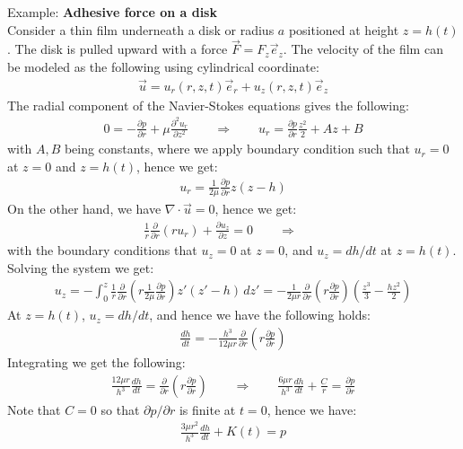 \documentclass[11pt]{book}
\theoremstyle{break}
\theoremstyle{break}
\newcommand{\pd}{\partial}
\newcommand{\example}{\color{green}Example: \color{black}}
\begin{document}
\example \textbf{Adhesive force on a disk}\\
Consider a thin film underneath a disk or radius $a$ positioned at height $z = h(t)$. The disk is pulled upward with a force $\vec{F} = F_z \vec{e}_z$. The velocity of the film can be modeled as the following using cylindrical coordinate:
\begin{align*}
\vec{u} = u_r (r,z,t) \vec{e}_r + u_z(r,z,t) \vec{e}_z
\end{align*}
The radial component of the Navier-Stokes equations gives the following:
\begin{align*}
0 = -\frac{\pd p}{\pd r} + \mu \frac{\pd^2 u_r}{\pd z^2} \qquad \Rightarrow\qquad u_r = \frac{\pd p}{\pd r}\frac{z^2}{2} + Az + B 
\end{align*}
with $A,B $ being constants, where we apply boundary condition such that $u_r = 0$ at $z = 0$ and $z = h(t)$, hence we get:
\begin{align*}
u_r = \frac{1}{2\mu}\frac{\pd p}{\pd r} z(z-h)
\end{align*}
On the other hand, we have $\nabla \cdot \vec{u} = 0$, hence we get:
\begin{align*}
\frac{1}{r}\frac{\pd }{\pd r}(ru_r) + \frac{\pd u_z}{\pd z} = 0 \qquad \Rightarrow \qquad 
\end{align*}
with the boundary conditions that $u_z = 0$ at $z = 0$, and $u_z = dh/dt$ at $z = h(t)$. Solving the system we get:
\begin{align*}
u_z = -\int_0^z \frac{1}{r}\frac{\pd }{\pd r}\left(r \frac{1}{2\mu}\frac{\pd p}{\pd r}\right)z'(z'-h) \, dz'=-\frac{1}{2\mu r}\frac{\pd}{\pd r}\left( r \frac{\pd p}{\pd r}\right) \left( \frac{z^3}{3} - \frac{hz^2}{2}\right)
\end{align*}
At $z=h(t)$, $u_z = dh/dt$, and hence we have the following holds:
\begin{align*}
\frac{dh}{dt} = -\frac{h^3}{12\mu r} \frac{\pd}{\pd r}\left( r \frac{\pd p}{\pd r}\right)
\end{align*}
Integrating we get the following:
\begin{align*}
\frac{12 \mu r}{h^3} \frac{dh}{dt} = \frac{\pd}{\pd r} \left( r \frac{\pd p}{\pd r}\right) \qquad \Rightarrow \qquad \frac{6\mu r}{h^3} \frac{dh}{dt} + \frac{C}{r} = \frac{\pd p}{\pd r}
\end{align*}
Note that $C = 0$ so that $\pd p /\pd r$ is finite at $t = 0$, hence we have:
\begin{align*}
\frac{3\mu r^2}{h^3}\frac{dh}{dt} + K(t) = p
\end{align*}
\end{document}
